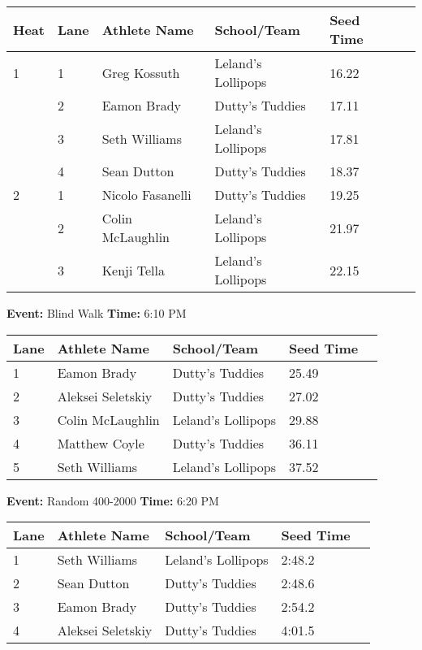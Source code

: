 \documentclass[11pt]{article}
\begin{document}
\vspace{1em}
\begin{tabular}{@{}llllll@{}}
\toprule
\textbf{{Heat}} &
\textbf{Lane} & \textbf{Athlete Name} & \textbf{School/Team} & \textbf{Seed Time} \\
\midrule
1 & 1 & Greg Kossuth & Leland's Lollipops & 16.22 &\\
 & 2 & Eamon Brady & Dutty's Tuddies & 17.11 &\\
 & 3 & Seth Williams & Leland's Lollipops & 17.81 &\\
 & 4 & Sean Dutton & Dutty's Tuddies & 18.37 &\\
2 & 1 & Nicolo Fasanelli & Dutty's Tuddies & 19.25 &\\
 & 2 & Colin McLaughlin & Leland's Lollipops & 21.97 &\\
 & 3 & Kenji Tella & Leland's Lollipops & 22.15 &\\
\bottomrule
\end{tabular}
\vspace{2.5em}


\textbf{Event:} Blind Walk \quad \textbf{Time:} 6:10 PM 

\vspace{1em}
\begin{tabular}{@{}lllll@{}}
\toprule

\textbf{Lane} & \textbf{Athlete Name} & \textbf{School/Team} & \textbf{Seed Time} \\
\midrule
1 & Eamon Brady & Dutty's Tuddies & 25.49 &\\
2 & Aleksei Seletskiy & Dutty's Tuddies & 27.02 &\\
3 & Colin McLaughlin & Leland's Lollipops & 29.88 &\\
4 & Matthew Coyle & Dutty's Tuddies & 36.11 &\\
5 & Seth Williams & Leland's Lollipops & 37.52 &\\
\bottomrule
\end{tabular}
\vspace{2.5em}


\textbf{Event:} Random 400-2000 \quad \textbf{Time:} 6:20 PM 

\vspace{1em}
\begin{tabular}{@{}lllll@{}}
\toprule

\textbf{Lane} & \textbf{Athlete Name} & \textbf{School/Team} & \textbf{Seed Time} \\
\midrule
1 & Seth Williams & Leland's Lollipops & 2:48.2 &\\
2 & Sean Dutton & Dutty's Tuddies & 2:48.6 &\\
3 & Eamon Brady & Dutty's Tuddies & 2:54.2 &\\
4 & Aleksei Seletskiy & Dutty's Tuddies & 4:01.5 &\\
\bottomrule
\end{tabular}
\vspace{2.5em}
\end{document}
